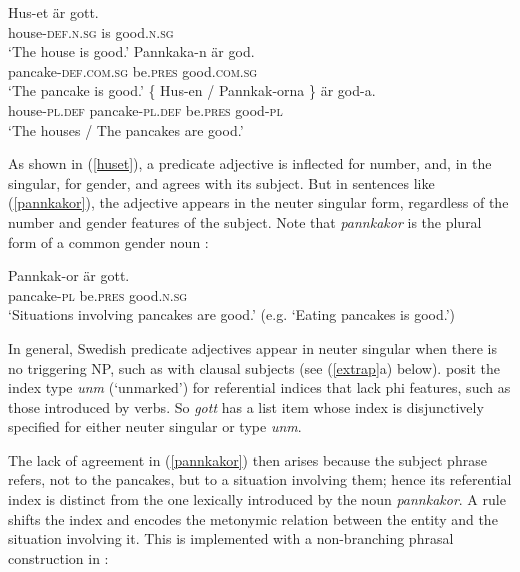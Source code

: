 \documentclass[output=paper
                ,modfonts
                ,nonflat
	        ,collection
	        ,collectionchapter
	        ,collectiontoclongg
 	        ,biblatex
                ,babelshorthands
                ,newtxmath
                ,draftmode
                ,colorlinks, citecolor=brown
]{./langsci/langscibook}
\begin{document}
{\begin{exe} 
\ex \label{huset}
 \begin{xlist}
\ex 
\gll 	Hus-et 	är	gott. \\
		house-\textsc{def.n.sg}	is	good.\textsc{n.sg} \\
\glt	`The house is good.’
\ex   
\gll  Pannkaka-n 	är	god. \\
	pancake-\textsc{def.com.sg} 	be.\textsc{pres} 	good.\textsc{com.sg} \\
\glt	`The pancake is good.’
\ex   
\gll   \{   Hus-en / Pannkak-orna 	\}	är	god-a. \\
	   {}   house-\textsc{pl.def} {} pancake-\textsc{pl.def} {} be.\textsc{pres} good-\textsc{pl}  \\
\glt	`The houses / The pancakes are good.’
\end{xlist}
\end{exe}

\noindent
As shown in (\ref{huset}), a predicate adjective is inflected for number, and, in the singular, for gender, and agrees with its subject. But in sentences like (\ref{pannkakor}), the adjective appears in the neuter singular form, regardless of the number and gender features of the subject.  Note that \textit{pannkakor} is the plural form of a common gender noun \citep{Faarlund:1977, Enger:2004,Josefsson:2009}:

\begin{exe} 
\ex \label{pannkakor}
\gll   Pannkak-or 	är	gott. \\
	pancake-\textsc{pl}	be.\textsc{pres}	good.\textsc{n.sg} \\
\glt	`Situations involving pancakes are good.’ (e.g. `Eating pancakes is good.’)
\end{exe}

\noindent
In general, Swedish predicate adjectives appear in neuter singular when there is no triggering NP, such as with clausal subjects (see (\ref{extrap}a) below).  \citet{Wechsler+Zlatic:2003} posit the index type \textit{unm} (`unmarked') for  referential indices that lack phi features, such as those introduced by verbs.   So \textit{gott} has a \subj list item whose index  is disjunctively specified for either neuter singular or type \textit{unm}.  

The lack of agreement in (\ref{pannkakor}) then arises because the subject phrase refers, not to the pancakes, but to a situation involving them; hence its referential index is distinct from the one lexically introduced by the noun \textit{pannkakor}.  A rule shifts the index and encodes the metonymic relation between the entity and the situation involving it.  This  is implemented with a non-branching phrasal construction in \citet[82, example\,(20)]{Wechsler:2013}:

}
\end{document}
